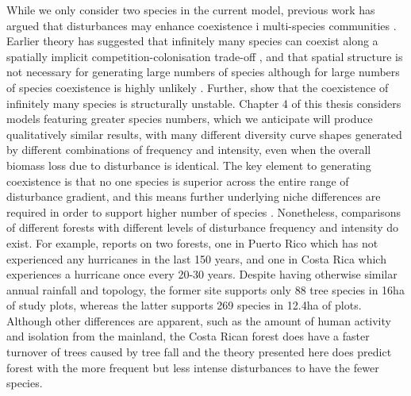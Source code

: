 While we only consider two species in the current model, previous work has argued that disturbances may enhance coexistence i multi-species communities \citep[e.g.][]{loehle2000strategy,roxburgh2004intermediate}. Earlier theory has suggested that infinitely many species can coexist along a spatially implicit competition-colonisation trade-off \citep[e.g.][]{tilman1994competition}, and that spatial structure is not necessary for generating large numbers of species \citep{adler2000space} although for large numbers of species coexistence is highly unlikely \citep[Chapter~1;][]{nattrass2012quantifying}. Further, \cite{gyllenberg2005impossibility} show that the coexistence of infinitely many species is structurally unstable. Chapter 4 of this thesis considers models featuring greater species numbers, which we anticipate will produce qualitatively similar results, with many different diversity curve shapes generated by different combinations of frequency and intensity, even when the overall biomass loss due to disturbance is identical. The key element to generating coexistence is that no one species is superior across the entire range of disturbance gradient, and this means further underlying niche differences are required in order to support higher number of species \citep[e.g.][]{seifan2013beyond}. Nonetheless, comparisons of different forests with different levels of disturbance frequency and intensity do exist. For example, \cite{denslow1987tropical} reports on two forests, one in Puerto Rico which has not experienced any hurricanes in the last 150 years, and one in Costa Rica which experiences a hurricane once every 20-30 years. Despite having otherwise similar annual rainfall and topology, the former site supports only 88 tree species in 16ha of study plots, whereas the latter supports 269 species in 12.4ha of plots. Although other differences are apparent, such as the amount of human activity and isolation from the mainland, the Costa Rican forest does have a faster turnover of trees caused by tree fall and the theory presented here does predict forest with the more frequent but less intense disturbances to have the fewer species.

